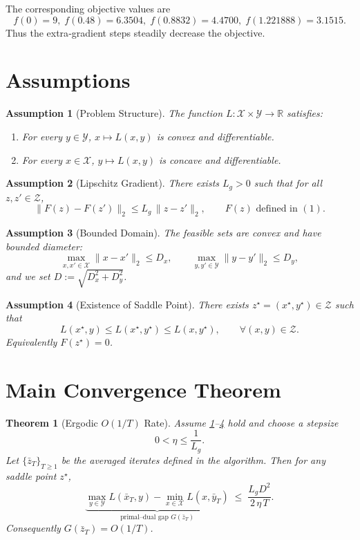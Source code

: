 \documentclass{article}
\newtheorem{theorem}{Theorem}
\newtheorem{assumption}{Assumption}
\newcommand{\R}{\mathbb{R}}
\begin{document}
The corresponding objective values are
\[
f(0)=9,\;f(0.48)=6.3504,\;f(0.8832)=4.4700,\;f(1.221888)=3.1515.
\]
Thus the extra‑gradient steps steadily decrease the objective.

\newpage
\section*{Assumptions}
\begin{assumption}[Problem Structure]\label{as:convexconcave}
The function $L:\mathcal{X}\times\mathcal{Y}\to\R$ satisfies:
\begin{enumerate}[label=(\roman*)]
\item For every $y\in\mathcal{Y}$, $x\mapsto L(x,y)$ is convex and differentiable.
\item For every $x\in\mathcal{X}$, $y\mapsto L(x,y)$ is concave and differentiable.
\end{enumerate}
\end{assumption}

\begin{assumption}[Lipschitz Gradient]\label{as:lipschitz}
There exists $L_{g}>0$ such that for all $z,z'\in\mathcal{Z}$,
\[
\|F(z)-F(z')\|_{2}\le L_{g}\,\|z-z'\|_{2},
\qquad
F(z)\text{ defined in }(1).
\tag{6}
\]
\end{assumption}

\begin{assumption}[Bounded Domain]\label{as:bounded}
The feasible sets are convex and have bounded diameter:
\[
\max_{x,x'\in\mathcal{X}}\|x-x'\|_{2}\le D_{x},
\qquad
\max_{y,y'\in\mathcal{Y}}\|y-y'\|_{2}\le D_{y},
\]
and we set $D:=\sqrt{D_{x}^{2}+D_{y}^{2}}$.
\end{assumption}

\begin{assumption}[Existence of Saddle Point]\label{as:saddle}
There exists $z^{\star}=(x^{\star},y^{\star})\in\mathcal{Z}$ such that
\[
L(x^{\star},y)\le L(x^{\star},y^{\star})\le L(x,y^{\star}),\qquad\forall (x,y)\in\mathcal{Z}.
\tag{7}
\]
Equivalently $F(z^{\star})=0$.
\end{assumption}

\section*{Main Convergence Theorem}
\begin{theorem}[Ergodic $O(1/T)$ Rate]\label{thm:rate}
Assume \ref{as:convexconcave}–\ref{as:saddle} hold and choose a stepsize
\[
0<\eta\le \frac{1}{L_{g}}.
\tag{8}
\]
Let $\{\bar z_{T}\}_{T\ge1}$ be the averaged iterates defined in the algorithm.  
Then for any saddle point $z^{\star}$,
\[
\underbrace{\max_{y\in\mathcal{Y}}L(\bar x_{T},y)-\min_{x\in\mathcal{X}}L(x,\bar y_{T})}_{\displaystyle\text{primal–dual gap }G(\bar z_{T})}
\;\le\;
\frac{L_{g}D^{2}}{2\,\eta\,T}.
\tag{9}
\]
Consequently $G(\bar z_{T})=O(1/T)$.
\end{theorem}
\end{document}
